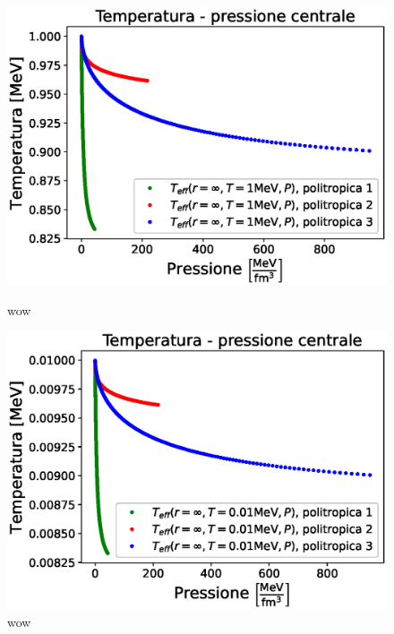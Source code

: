 \documentclass[a4paper, titlepage]{article}
\begin{document}
\begin{figure}[h]
    \begin{minipage}{0.49 \textwidth}
        \centering
        \includegraphics[width = \textwidth]{Figures/Teff1_su_P.eps}
        \caption{wow}
        \label{fig:Teff1_su_P}
    \end{minipage}
    \hspace{0.015 \textwidth}
    \begin{minipage}{0.49 \textwidth}
        \centering
        \includegraphics[width = \textwidth]{Figures/Teff001_su_P.eps}
        \caption{wow}
        \label{fig:Teff1_su_P}
    \end{minipage}
\end{figure}
\end{document}
